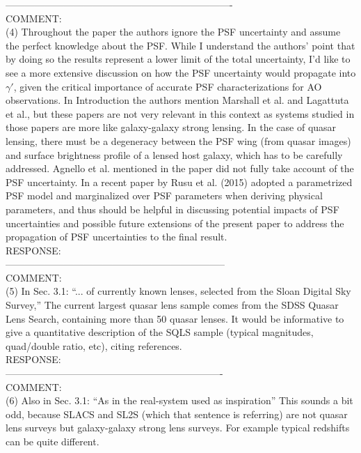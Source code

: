 \documentclass[a4paper,11pt]{article}
\begin{document}
----------------------------------------------------------------------
\\
COMMENT:
\\
(4) Throughout the paper the authors ignore the PSF uncertainty and assume the perfect knowledge about the PSF. While I understand the authors’ point that by doing so the results represent a lower limit of the total uncertainty, I’d like to see a more extensive discussion on how the PSF uncertainty would propagate into $\gamma'$, given the critical importance of accurate PSF characterizations for AO observations. In Introduction the authors mention Marshall et al. and Lagattuta et al., but these papers are not very relevant in this context as systems studied in those papers are more like galaxy-galaxy strong lensing. In the case of quasar lensing, there must be a degeneracy between the PSF wing (from quasar images) and surface brightness profile of a lensed host galaxy, which has to be carefully addressed. Agnello et al. mentioned in the paper did not fully take account of the PSF uncertainty. In a recent paper by Rusu et al. (2015) adopted a parametrized PSF model and marginalized over PSF parameters when deriving physical parameters, and thus should be helpful in discussing potential impacts of PSF uncertainties and possible future extensions of the present paper to address the propagation of PSF uncertainties to the final result.
\\

RESPONSE:
\\ 
--------------------------------------------------------------------
\\
COMMENT:
\\
(5) In Sec. 3.1: “... of currently known lenses, selected from the Sloan Digital Sky Survey,” The current largest quasar lens sample comes from the SDSS Quasar Lens Search, containing more than 50 quasar lenses. It would be informative to give a quantitative description of the SQLS sample (typical magnitudes, quad/double ratio, etc), citing references.
\\

RESPONSE:
\\

-------------------------------------------------------------------
\\
COMMENT:
\\
(6) Also in Sec. 3.1: ``As in the real-system used as inspiration'' This sounds a bit odd, because SLACS and SL2S (which that sentence is referring) are not quasar lens surveys but galaxy-galaxy strong lens surveys. For example typical redshifts can be quite different.
\\
\end{document}
